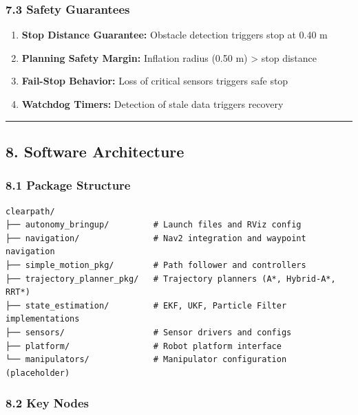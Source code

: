 \hypertarget{safety-guarantees}{%
\subsubsection{7.3 Safety Guarantees}\label{safety-guarantees}}

\begin{enumerate}
\def\labelenumi{\arabic{enumi}.}
\tightlist
\item
  \textbf{Stop Distance Guarantee:} Obstacle detection triggers stop at
  0.40 m
\item
  \textbf{Planning Safety Margin:} Inflation radius (0.50 m)
  \textgreater{} stop distance
\item
  \textbf{Fail-Stop Behavior:} Loss of critical sensors triggers safe
  stop
\item
  \textbf{Watchdog Timers:} Detection of stale data triggers recovery
\end{enumerate}

\begin{center}\rule{0.5\linewidth}{0.5pt}\end{center}

\hypertarget{software-architecture}{%
\subsection{8. Software Architecture}\label{software-architecture}}

\hypertarget{package-structure}{%
\subsubsection{8.1 Package Structure}\label{package-structure}}

\begin{verbatim}
clearpath/
├── autonomy_bringup/         # Launch files and RViz config
├── navigation/               # Nav2 integration and waypoint navigation
├── simple_motion_pkg/        # Path follower and controllers
├── trajectory_planner_pkg/   # Trajectory planners (A*, Hybrid-A*, RRT*)
├── state_estimation/         # EKF, UKF, Particle Filter implementations
├── sensors/                  # Sensor drivers and configs
├── platform/                 # Robot platform interface
└── manipulators/             # Manipulator configuration (placeholder)
\end{verbatim}

\hypertarget{key-nodes}{%
\subsubsection{8.2 Key Nodes}\label{key-nodes}}

